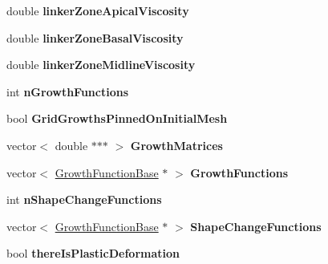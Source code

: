 \begin{DoxyCompactItemize}
\item 
\hypertarget{classSimulation_a8f11d2644c957402cd0e6e1b4c652182}{}double {\bfseries linker\+Zone\+Apical\+Viscosity}\label{classSimulation_a8f11d2644c957402cd0e6e1b4c652182}

\item 
\hypertarget{classSimulation_af7b9b2275582a0d94b6ac6709b0f73eb}{}double {\bfseries linker\+Zone\+Basal\+Viscosity}\label{classSimulation_af7b9b2275582a0d94b6ac6709b0f73eb}

\item 
\hypertarget{classSimulation_a5810bcef5e865af1cdbfb8e0586fa12d}{}double {\bfseries linker\+Zone\+Midline\+Viscosity}\label{classSimulation_a5810bcef5e865af1cdbfb8e0586fa12d}

\item 
\hypertarget{classSimulation_a47187b5d7f450b1c41e6fdaffeedc207}{}int {\bfseries n\+Growth\+Functions}\label{classSimulation_a47187b5d7f450b1c41e6fdaffeedc207}

\item 
\hypertarget{classSimulation_ae83cadb5675d5ef391adb5d1595070ec}{}bool {\bfseries Grid\+Growths\+Pinned\+On\+Initial\+Mesh}\label{classSimulation_ae83cadb5675d5ef391adb5d1595070ec}

\item 
\hypertarget{classSimulation_a8cdab34c42a949aeeaa2b76fe5cf7d76}{}vector$<$ double $\ast$$\ast$$\ast$ $>$ {\bfseries Growth\+Matrices}\label{classSimulation_a8cdab34c42a949aeeaa2b76fe5cf7d76}

\item 
\hypertarget{classSimulation_a88e857983b0152e32b969dfd3ed72fdc}{}vector$<$ \hyperlink{classGrowthFunctionBase}{Growth\+Function\+Base} $\ast$ $>$ {\bfseries Growth\+Functions}\label{classSimulation_a88e857983b0152e32b969dfd3ed72fdc}

\item 
\hypertarget{classSimulation_a74251252e9f320268055537749d674c1}{}int {\bfseries n\+Shape\+Change\+Functions}\label{classSimulation_a74251252e9f320268055537749d674c1}

\item 
\hypertarget{classSimulation_a92ba3cb43bcbabf7e617755a28cb648b}{}vector$<$ \hyperlink{classGrowthFunctionBase}{Growth\+Function\+Base} $\ast$ $>$ {\bfseries Shape\+Change\+Functions}\label{classSimulation_a92ba3cb43bcbabf7e617755a28cb648b}

\item 
\hypertarget{classSimulation_ab0d54e9e505f3701cf5ca8b0ac0df00a}{}bool {\bfseries there\+Is\+Plastic\+Deformation}\label{classSimulation_ab0d54e9e505f3701cf5ca8b0ac0df00a}


\end{DoxyCompactItemize}
